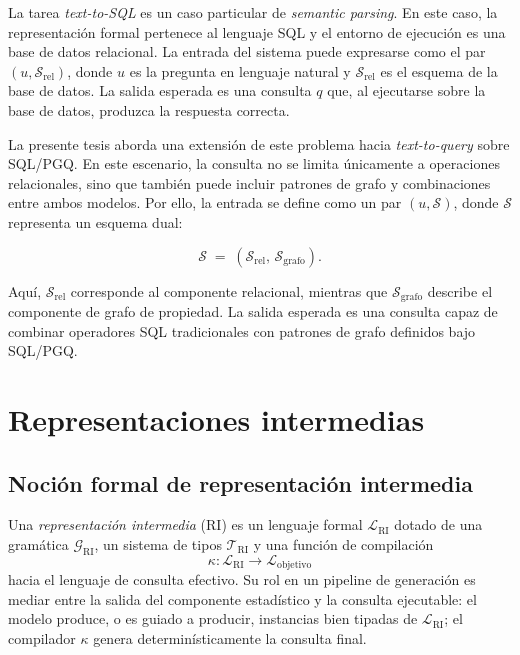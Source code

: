 La tarea \emph{text-to-SQL} es un caso particular de \emph{semantic parsing}. En este caso, la representación formal pertenece al lenguaje SQL y el entorno de ejecución es una base de datos relacional. La entrada del sistema puede expresarse como el par $(u, \mathcal{S}_{\mathrm{rel}})$, donde $u$ es la pregunta en lenguaje natural y $\mathcal{S}_{\mathrm{rel}}$ es el esquema de la base de datos. La salida esperada es una consulta $q$ que, al ejecutarse sobre la base de datos, produzca la respuesta correcta.

La presente tesis aborda una extensión de este problema hacia \emph{text-to-query} sobre \ac{SQL}/\ac{PGQ}. En este escenario, la consulta no se limita únicamente a operaciones relacionales, sino que también puede incluir patrones de grafo y combinaciones entre ambos modelos. Por ello, la entrada se define como un par $(u, \mathcal{S})$, donde $\mathcal{S}$ representa un esquema dual:

\[
\mathcal{S} \;=\; (\mathcal{S}_{\mathrm{rel}},\, \mathcal{S}_{\mathrm{grafo}}).
\]

Aquí, $\mathcal{S}_{\mathrm{rel}}$ corresponde al componente relacional, mientras que $\mathcal{S}_{\mathrm{grafo}}$ describe el componente de grafo de propiedad. La salida esperada es una consulta capaz de combinar operadores SQL tradicionales con patrones de grafo definidos bajo \ac{SQL}/\ac{PGQ}.

\section{Representaciones intermedias}
\label{sec:ri}

\subsection{Noción formal de representación intermedia}

Una \emph{representación intermedia} (\ac{RI}) es un lenguaje formal $\mathcal{L}_{\mathrm{RI}}$ dotado de una gramática $\mathcal{G}_{\mathrm{RI}}$, un sistema de tipos $\mathcal{T}_{\mathrm{RI}}$ y una función de compilación
\[
\kappa: \mathcal{L}_{\mathrm{RI}} \to \mathcal{L}_{\mathrm{objetivo}}
\]
hacia el lenguaje de consulta efectivo. Su rol en un pipeline de generación es mediar entre la salida del componente estadístico y la consulta ejecutable: el modelo produce, o es guiado a producir, instancias bien tipadas de $\mathcal{L}_{\mathrm{RI}}$; el compilador $\kappa$ genera determinísticamente la consulta final.

